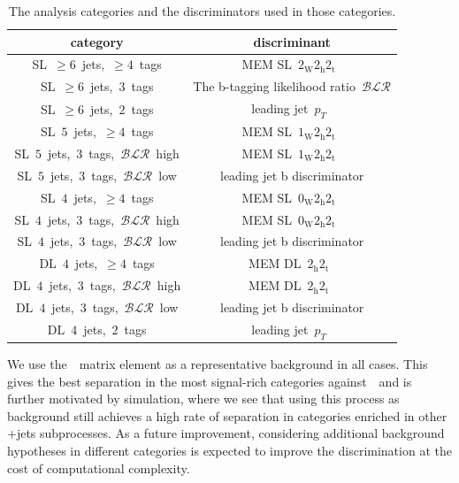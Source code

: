 \begin{table}[h!]
\begin{center}
\caption[The analysis categories for the~\ttHbb~analysis.]{The analysis categories and the discriminators used in those categories.}
\label{tab:cat_discriminant}
\begin{tabular}{c|c}
\hline
category & discriminant \\
\hline
SL~$\ge6$~jets,~$\ge4$~tags & MEM SL~$2_{\mathrm{W}} 2_{\mathrm{h}} 2_{\mathrm{t}}$~\\
SL~$\ge6$~jets,~$3$~tags & The b-tagging likelihood ratio~$\mathcal{BLR}$ \\
SL~$\ge6$~jets,~$2$~tags & leading jet~$p_T$~\\
\hline
SL~$5$~jets,~$\ge4$~tags & MEM SL~$1_{\mathrm{W}} 2_{\mathrm{h}} 2_{\mathrm{t}}$~\\
SL~$5$~jets,~$3$~tags,~$\mathcal{BLR}$~high & MEM SL~$1_{\mathrm{W}} 2_{\mathrm{h}} 2_{\mathrm{t}}$~\\
SL~$5$~jets,~$3$~tags,~$\mathcal{BLR}$~low & leading jet b discriminator \\
\hline
SL~$4$~jets,~$\ge4$~tags & MEM SL~$0_{\mathrm{W}} 2_{\mathrm{h}} 2_{\mathrm{t}}$~\\
SL~$4$~jets,~$3$~tags,~$\mathcal{BLR}$~high & MEM SL~$0_{\mathrm{W}} 2_{\mathrm{h}} 2_{\mathrm{t}}$~\\
SL~$4$~jets,~$3$~tags,~$\mathcal{BLR}$~low & leading jet b discriminator \\
\hline
DL~$4$~jets,~$\ge4$~tags & MEM DL~$2_{\mathrm{h}} 2_{\mathrm{t}}$~\\
DL~$4$~jets,~$3$~tags,~$\mathcal{BLR}$~high & MEM DL~$2_{\mathrm{h}} 2_{\mathrm{t}}$~\\
DL~$4$~jets,~$3$~tags,~$\mathcal{BLR}$~low & leading jet b discriminator \\
DL~$4$~jets,~$2$~tags & leading jet~$p_T$~\\
\hline
\hline
\end{tabular}
\end{center}
\end{table}

We use the~\ttbb~matrix element as a representative background in all cases. This gives the best separation in the most signal-rich categories against~\ttbb~and is further motivated by simulation, where we see that using this process as background still achieves a high rate of separation in categories enriched in other \ttbar+jets subprocesses. As a future improvement, considering additional background hypotheses in different categories is expected to improve the discrimination at the cost of computational complexity.


